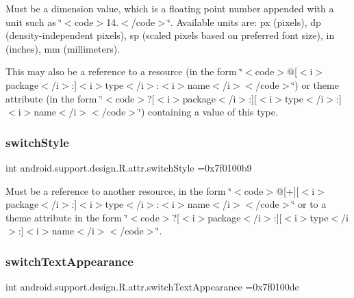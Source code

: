 Must be a dimension value, which is a floating point number appended with a unit such as \char`\"{}$<$code$>$14.\+5sp$<$/code$>$\char`\"{}. Available units are\+: px (pixels), dp (density-\/independent pixels), sp (scaled pixels based on preferred font size), in (inches), mm (millimeters). 

This may also be a reference to a resource (in the form \char`\"{}$<$code$>$@\mbox{[}$<$i$>$package$<$/i$>$\+:\mbox{]}$<$i$>$type$<$/i$>$\+:$<$i$>$name$<$/i$>$$<$/code$>$\char`\"{}) or theme attribute (in the form \char`\"{}$<$code$>$?\mbox{[}$<$i$>$package$<$/i$>$\+:\mbox{]}\mbox{[}$<$i$>$type$<$/i$>$\+:\mbox{]}$<$i$>$name$<$/i$>$$<$/code$>$\char`\"{}) containing a value of this type. \mbox{\label{classandroid_1_1support_1_1design_1_1R_1_1attr_a80507bb157d6c92971b9182db9cb6f3a}} 
\subsubsection{\texorpdfstring{switch\+Style}{switchStyle}}
{\footnotesize\ttfamily int android.\+support.\+design.\+R.\+attr.\+switch\+Style =0x7f0100b9\hspace{0.3cm}{\ttfamily [static]}}

Must be a reference to another resource, in the form \char`\"{}$<$code$>$@\mbox{[}+\mbox{]}\mbox{[}$<$i$>$package$<$/i$>$\+:\mbox{]}$<$i$>$type$<$/i$>$\+:$<$i$>$name$<$/i$>$$<$/code$>$\char`\"{} or to a theme attribute in the form \char`\"{}$<$code$>$?\mbox{[}$<$i$>$package$<$/i$>$\+:\mbox{]}\mbox{[}$<$i$>$type$<$/i$>$\+:\mbox{]}$<$i$>$name$<$/i$>$$<$/code$>$\char`\"{}. \mbox{\label{classandroid_1_1support_1_1design_1_1R_1_1attr_ac71231e27777af35142128f3a2243b31}} 
\subsubsection{\texorpdfstring{switch\+Text\+Appearance}{switchTextAppearance}}
{\footnotesize\ttfamily int android.\+support.\+design.\+R.\+attr.\+switch\+Text\+Appearance =0x7f0100de\hspace{0.3cm}{\ttfamily [static]}}

